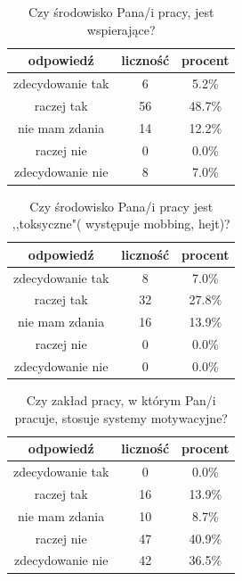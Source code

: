 \documentclass[a4paper,12pt,twoside,openany]{report}
\begin{document}
\begin{table}[h]
\caption{Czy  środowisko  Pana/i pracy, jest wspierające?}
\centering
\begin{tabular}{ | c | c | c |}
\hline
odpowiedź & liczność & procent\\
\hline
zdecydowanie tak  &  6  & 5.2\% \\
\hline
raczej tak  &  56  & 48.7\% \\
\hline
nie mam zdania  &  14  & 12.2\% \\
\hline
raczej nie  &  0  & 0.0\% \\
\hline
zdecydowanie nie  &  8  & 7.0\% \\
\hline
\end{tabular}
\label{tab:Q7}
\end{table}



\begin{table}[h]
\caption{Czy środowisko Pana/i pracy jest ,,toksyczne"( występuje mobbing, hejt)?}
\centering
\begin{tabular}{ | c | c | c |}
\hline
odpowiedź & liczność & procent\\
\hline
zdecydowanie tak  &  8  & 7.0\% \\
\hline
raczej tak  &  32  & 27.8\% \\
\hline
nie mam zdania  &  16  & 13.9\% \\
\hline
raczej nie  &  0  & 0.0\% \\
\hline
zdecydowanie nie  &  0  & 0.0\% \\
\hline
\end{tabular}
\label{tab:Q8}
\end{table}



\begin{table}[h]
\caption{Czy zakład pracy, w którym Pan/i pracuje, stosuje systemy motywacyjne?}
\centering
\begin{tabular}{ | c | c | c |}
\hline
odpowiedź & liczność & procent\\
\hline
zdecydowanie tak  &  0  & 0.0\% \\
\hline
raczej tak  &  16  & 13.9\% \\
\hline
nie mam zdania  &  10  & 8.7\% \\
\hline
raczej nie  &  47  & 40.9\% \\
\hline
zdecydowanie nie  &  42  & 36.5\% \\
\hline
\end{tabular}
\label{tab:Q9}
\end{table}
\end{document}
